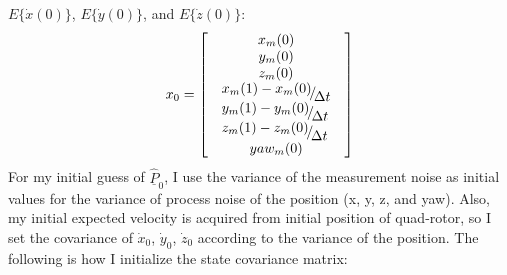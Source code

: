 \documentclass[10pt,letterpaper]{article}
\begin{document}
 $E\{\dot{x}(0)\}$, $E\{\dot{y}(0)\}$, and $E\{\dot{z}(0)\}$:
\begin{equation}
	x_0  = \left[ {\begin{array}{*{20}c}
	   {x_m (0)}  \\
	   \begin{array}{l}
	 y_m (0) \\ 
	 z_m (0) \\ 
	 \end{array}  \\
	   \begin{array}{l}
	 {\raise0.7ex\hbox{${x_m (1) - x_m (0)}$} \!\mathord{\left/
	 {\vphantom {{x_m (1) - x_m (0)} {\Delta t}}}\right.\kern-\nulldelimiterspace}
	\!\lower0.7ex\hbox{${\Delta t}$}} \\ 
	 {\raise0.7ex\hbox{${y_m (1) - y_m (0)}$} \!\mathord{\left/
	 {\vphantom {{y_m (1) - y_m (0)} {\Delta t}}}\right.\kern-\nulldelimiterspace}
	\!\lower0.7ex\hbox{${\Delta t}$}} \\ 
	 {\raise0.7ex\hbox{${z_m (1) - z_m (0)}$} \!\mathord{\left/
	 {\vphantom {{z_m (1) - z_m (0)} {\Delta t}}}\right.\kern-\nulldelimiterspace}
	\!\lower0.7ex\hbox{${\Delta t}$}} \\ 
	 \end{array}  \\
	   {yaw_m (0)}  \\
	\end{array}} \right]
\end{equation} 
For my initial guess of $\underline{\hat{P}}_0$, I use the variance of the measurement noise as initial values 
for the variance of process noise of the position (x, y, z, and yaw). Also, my initial expected velocity is acquired 
from initial position of quad-rotor, so I set the covariance of $\dot{x}_0$, $\dot{y}_0$, $\dot{z}_0$ according to 
the variance of the position. The following is how I initialize the state covariance matrix:
\end{document}
